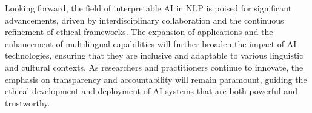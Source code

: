 Looking forward, the field of interpretable AI in NLP is poised for significant advancements, driven by interdisciplinary collaboration and the continuous refinement of ethical frameworks. The expansion of applications and the enhancement of multilingual capabilities will further broaden the impact of AI technologies, ensuring that they are inclusive and adaptable to various linguistic and cultural contexts. As researchers and practitioners continue to innovate, the emphasis on transparency and accountability will remain paramount, guiding the ethical development and deployment of AI systems that are both powerful and trustworthy.